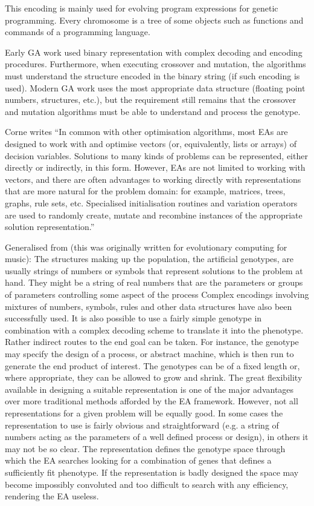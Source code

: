 This encoding is mainly used for evolving program expressions for genetic programming.
Every chromosome is a tree of some objects such as functions and commands
of a programming language.

Early GA work used binary representation with complex decoding and encoding procedures. Furthermore, when executing crossover and mutation, the algorithms must understand the structure encoded in the binary string (if such encoding is used). Modern GA work uses the most appropriate data structure (floating point numbers, structures, etc.), but the requirement still remains that the crossover and mutation algorithms must be able to 
understand and process the genotype.

Corne writes \cite{Corne2018} 
``In common with other optimisation algorithms, most EAs are designed to work with and optimise vectors (or, equivalently, lists or arrays) of decision variables. Solutions to many kinds of problems can be represented, either directly or indirectly, in this form. However, EAs are not limited to working with vectors, and there are often advantages to working directly with representations that are more natural for the problem domain: for example, matrices, trees, graphs, rule sets, etc. Specialised initialisation routines and variation operators are used to randomly create, mutate and recombine instances of the appropriate solution representation.''

Generalised from \cite{Husbands2007} (this was originally written for evolutionary computing for music):
The structures making up the population, the artificial genotypes, are usually strings
of numbers or symbols that represent solutions to the problem at hand. They might be
a string of real numbers that are the parameters or groups of parameters controlling some aspect of the process
Complex encodings involving mixtures of numbers, symbols, rules and other
data structures have also been successfully used. It is also possible to use a fairly simple genotype in
combination with a complex decoding scheme to translate it into the phenotype.
Rather indirect routes to the end goal can be taken. For instance, the genotype may
specify the design of a process, or abstract machine, which is then run to generate the
end product of interest. The genotypes can be of a fixed length
or, where appropriate, they can be allowed to grow and shrink. The great flexibility
available in designing a suitable representation is one of the major advantages over
more traditional methods afforded by the EA framework. However, not all
representations for a given problem will be equally good. In some cases the
representation to use is fairly obvious and straightforward (e.g. a string of numbers
acting as the parameters of a well defined process or design), in others it may not be
so clear. The representation defines the genotype space through which the EA
searches looking for a combination of genes that defines a sufficiently fit phenotype.
If the representation is badly designed the space may become impossibly convoluted
and too difficult to search with any efficiency, rendering the EA useless. 


